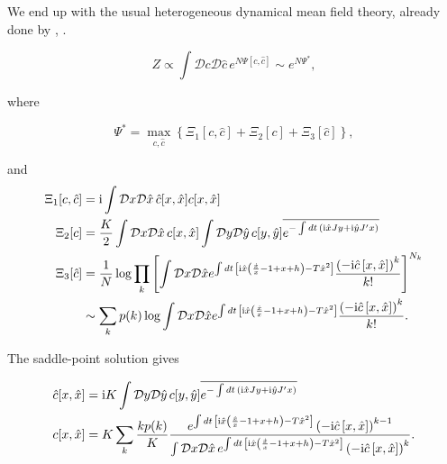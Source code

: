 \documentclass[
    preprint,
    linenumbers,
    amsmath,amssymb,amsfonts,
    aps, physrev,
    superscriptaddress,
    10pt,
    bibnotes
    ]{revtex4-2}
\begin{document}
We end up with the usual heterogeneous dynamical mean field theory,
already done by \cite{aguirre-lopezHeterogeneousMeanfieldAnalysis2024},
.

\begin{equation}
Z\propto\int\mathcal{D}c\mathcal{D}\hat{c}\,e^{N\Psi[c,\hat{c}]}\sim e^{N\Psi^{*}},
\end{equation}

where

\begin{equation}
\Psi^{*}=\max_{c,\hat{c}}\left\{ \Xi_{1}[c,\hat{c}]+\Xi_{2}[c]+\Xi_{3}[\hat{c}]\right\} ,
\end{equation}

and
\begin{subequations}
\begin{align}
\Xi_{1}[c,\hat{c}] & ={\rm i}\int\mathcal{D}x\mathcal{D}\hat{x}\,\hat{c}[x,\hat{x}]c[x,\hat{x}]\\
\Xi_{2}[c] & =\frac{K}{2}\int\mathcal{D}x\mathcal{D}\hat{x}\,c[x,\hat{x}]\int\mathcal{D}y\mathcal{D}\hat{y}\,c[y,\hat{y}]\overline{e^{-\int dt\,\left({\rm i}\hat{x}Jy+{\rm i}\hat{y}J'x\right)}}\\
\Xi_{3}[\hat{c}] & =\frac{1}{N}\log\prod_{k}\left[\int\mathcal{D}x\mathcal{D}\hat{x}e^{\int dt\,\left[{\rm i}\hat{x}\left(\frac{\dot{x}}{x}-1+x+h\right)-T\hat{x}^{2}\right]}\frac{\left(-{\rm i}\hat{c}\left[x,\hat{x}\right]\right)^{k}}{k!}\right]^{N_{k}}\nonumber \\
 & \sim\sum_{k}p(k)\log\int\mathcal{D}x\mathcal{D}\hat{x}e^{\int dt\,\left[{\rm i}\hat{x}\left(\frac{\dot{x}}{x}-1+x+h\right)-T\hat{x}^{2}\right]}\frac{\left(-{\rm i}\hat{c}\left[x,\hat{x}\right]\right)^{k}}{k!}.
\end{align}
\end{subequations}

The saddle-point solution gives

\begin{subequations}
\begin{align}
\hat{c}[x,\hat{x}] & ={\rm i}K\int\mathcal{D}y\mathcal{D}\hat{y}\,c[y,\hat{y}]\overline{e^{-\int dt\,\left({\rm i}\hat{x}Jy+{\rm i}\hat{y}J'x\right)}}\\
c[x,\hat{x}] & =K\sum_{k}\frac{kp(k)}{K}\frac{e^{\int dt\,\left[{\rm i}\hat{x}\left(\frac{\dot{x}}{x}-1+x+h\right)-T\hat{x}^{2}\right]}\left(-{\rm i}\hat{c}\left[x,\hat{x}\right]\right)^{k-1}}{\int\mathcal{D}x\mathcal{D}\hat{x}\,e^{\int dt\,\left[{\rm i}\hat{x}\left(\frac{\dot{x}}{x}-1+x+h\right)-T\hat{x}^{2}\right]}\left(-{\rm i}\hat{c}\left[x,\hat{x}\right]\right)^{k}}.
\end{align}
\end{subequations}
\end{document}
